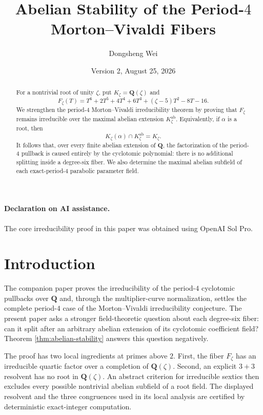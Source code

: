 \documentclass[11pt]{article}
\title{Abelian Stability of the Period-$4$ Morton--Vivaldi Fibers}
\author{Dongsheng Wei}
\date{Version 2, August 25, 2026}
\newcommand{\Q}{\mathbf Q}
\begin{document}
\maketitle

\paragraph{Declaration on AI assistance.}
The core irreducibility proof in this paper was obtained using OpenAI
Sol Pro.

\begin{abstract}
For a nontrivial root of unity $\zeta$, put $K_\zeta=\Q(\zeta)$ and
\[
 F_\zeta(T)=T^6+2T^5+4T^4+6T^3+(\zeta-5)T^2-8T-16.
\]
We strengthen the period-$4$ Morton--Vivaldi irreducibility theorem by
proving that $F_\zeta$ remains irreducible over the maximal abelian
extension $K_\zeta^{\mathrm{ab}}$.  Equivalently, if $\alpha$ is a
root, then
\[
 K_\zeta(\alpha)\cap K_\zeta^{\mathrm{ab}}=K_\zeta.
\]
It follows that, over every finite abelian extension of $\Q$, the
factorization of the period-$4$ pullback is caused entirely by the
cyclotomic polynomial: there is no additional splitting inside a
degree-six fiber.  We also determine the maximal abelian subfield of
each exact-period-$4$ parabolic parameter field.
\end{abstract}

\section{Introduction}

The companion paper \cite{WeiPeriod4} proves the irreducibility of the
period-$4$ cyclotomic pullbacks over $\Q$ and, through the multiplier-curve
normalization, settles the complete period-$4$ case of the Morton--Vivaldi
irreducibility conjecture.  The present paper asks a stronger field-theoretic
question about each degree-six fiber: can it split after an arbitrary abelian
extension of its cyclotomic coefficient field?  Theorem
\ref{thm:abelian-stability} answers this question negatively.

The proof has two local ingredients at primes above $2$.  First, the fiber
$F_\zeta$ has an irreducible quartic factor over a completion of
$\Q(\zeta)$.  Second, an explicit $3+3$ resolvent has no root in
$\Q(\zeta)$.  An abstract criterion for irreducible sextics then excludes
every possible nontrivial abelian subfield of a root field.  The displayed
resolvent and the three congruences used in its local analysis are certified
by deterministic exact-integer computation.
\end{document}
